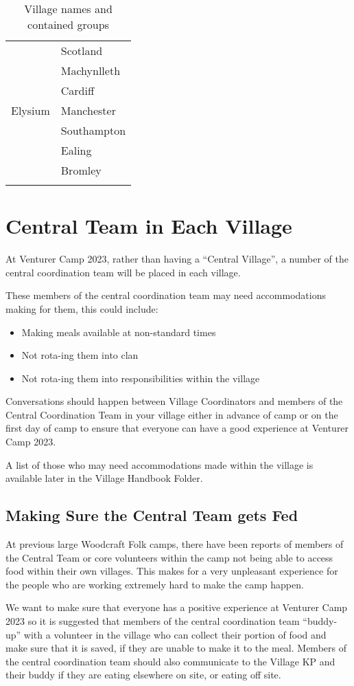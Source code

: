 \documentclass[a4paper, 11pt]{report}
\begin{document}
{\begin{longtable}{p{} p{}}
        \multirow{7}{*}{Elysium} & Scotland\\*
        & Machynlleth \\*
        & Cardiff \\*
        & Manchester \\*
        & Southampton \\*
        & Ealing \\*
        & Bromley \\
        \hline

\caption{Village names and contained groups}
\end{longtable}
}

\section{Central Team in Each Village}
At Venturer Camp 2023, rather than having a ``Central Village'', a number of the central coordination team will be placed in each village.\nl

These members of the central coordination team may need accommodations making for them, this could include:
\begin{itemize}
    \item Making meals available at non-standard times
    \item Not rota-ing them into clan
    \item Not rota-ing them into responsibilities within the village
\end{itemize}
Conversations should happen between Village Coordinators and members of the Central Coordination Team in your village either in advance of camp or on the first day of camp to ensure that everyone can have a good experience at Venturer Camp 2023.\nl

A list of those who may need accommodations made within the village is available later in the Village Handbook Folder.

\subsection{Making Sure the Central Team gets Fed}
At previous large Woodcraft Folk camps, there have been reports of members of the Central Team or core volunteers within the camp not being able to access food within their own villages. This makes for a very unpleasant experience for the people who are working extremely hard to make the camp happen.\nl

We want to make sure that everyone has a positive experience at Venturer Camp 2023 so it is suggested that members of the central coordination team ``buddy-up'' with a volunteer in the village who can collect their portion of food and make sure that it is saved, if they are unable to make it to the meal. Members of the central coordination team should also communicate to the Village KP and their buddy if they are eating elsewhere on site, or eating off site. 
\end{document}
